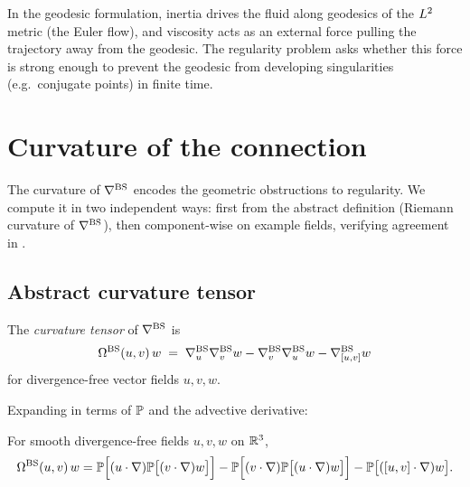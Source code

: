 \begin{remark}
  In the geodesic formulation, inertia drives the fluid along geodesics of the $L^{2}$
  metric (the Euler flow), and viscosity acts as an external force pulling the trajectory
  away from the geodesic.  The regularity problem asks whether this force is strong enough
  to prevent the geodesic from developing singularities (e.g.\ conjugate points) in
  finite time.
\end{remark}

\section{Curvature of the connection}\label{sec:bs-curvature}

The curvature of $\nabla^{\mathrm{BS}}$ encodes the geometric obstructions to regularity.  We compute
it in two independent ways: first from the abstract definition (Riemann curvature of
$\nabla^{\mathrm{BS}}$), then component-wise on example fields, verifying agreement in .

\subsection{Abstract curvature tensor}

\begin{definition}\label{def:riemann-curv}
  The \emph{curvature tensor} of $\nabla^{\mathrm{BS}}$ is
  \begin{equation}\label{eq:curvature-def}
    \Omega^{\mathrm{BS}}(u, v)\,w
    \;=\; \nabla^{\mathrm{BS}}_u\nabla^{\mathrm{BS}}_v w - \nabla^{\mathrm{BS}}_v\nabla^{\mathrm{BS}}_u w - \nabla^{\mathrm{BS}}_{[u,v]} w
  \end{equation}
  for divergence-free vector fields $u, v, w$.
\end{definition}

Expanding in terms of $\mathbb{P}$ and the advective derivative:

\begin{proposition}\label{prop:curvature-formula}
  For smooth divergence-free fields $u, v, w$ on $\mathbb{R}^3$,
  \begin{equation}\label{eq:curvature-explicit}
    \Omega^{\mathrm{BS}}(u,v)\,w
    = \mathbb{P}\Bigl[(u \cdot \nabla)\mathbb{P}\bigl[(v \cdot \nabla)w\bigr]\Bigr]
    - \mathbb{P}\Bigl[(v \cdot \nabla)\mathbb{P}\bigl[(u \cdot \nabla)w\bigr]\Bigr]
    - \mathbb{P}\bigl[([u,v] \cdot \nabla)w\bigr].
  \end{equation}
\end{proposition}


